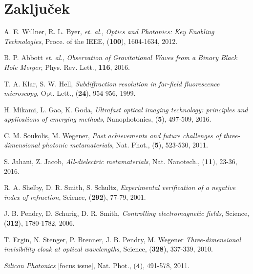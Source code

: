 \documentclass[longbibliography,slovene,a4paper,12pt]{book}
\begin{document}
\chapter{Zaključek}



\cleardoublepage{}
{}



\begin{thebibliography}{15}
	A. E. Willner, R. L. Byer, \emph{et. al.},
	\emph{Optics and Photonics: Key Enabling Technologies},
	Proce. of the IEEE, (\textbf{100}), 1604-1634, 2012.
	
	B. P. Abbott \emph{et. al.},
	\emph{Observation of Gravitational Waves from a Binary Black Hole Merger},
	Phys. Rev. Lett., \textbf{116}, 2016.
	
	T. A. Klar, S. W. Hell,
	\emph{Subdiffraction resolution in far-field fluorescence microscopy},
	Opt. Lett., (\textbf{24}), 954-956, 1999.
	
	H. Mikami, L. Gao, K. Goda,
	\emph{Ultrafast optical imaging technology: principles and applications of emerging methods},
	Nanophotonics, (\textbf{5}), 497-509, 2016.
	
	C. M. Soukolis, M. Wegener, 
	\emph{Past achievements and future challenges of three-dimensional photonic metamaterials},
	Nat. Phot., (\textbf{5}), 523-530, 2011.

	S. Jahani, Z. Jacob, 
	\emph{All-dielectric metamaterials},
	Nat. Nanotech., (\textbf{11}), 23-36, 2016.
	
	R. A. Shelby, D. R. Smith, S. Schultz,
	\emph{Experimental verification of a negative index of refraction},
	Science, (\textbf{292}), 77-79, 2001.

	J. B. Pendry, D. Schurig, D. R. Smith,
	\emph{Controlling electromagnetic fields},
	Science, (\textbf{312}), 1780-1782, 2006.

	T. Ergin, N. Stenger, P. Brenner, J. B. Pendry, M. Wegener
	\emph{Three-dimensional invisibility cloak at optical wavelengths},
	Science, (\textbf{328}), 337-339, 2010.

	\emph{Silicon Photonics} [focus issue],
	Nat. Phot., (\textbf{4}), 491-578, 2011.


\end{thebibliography}
\end{document}
